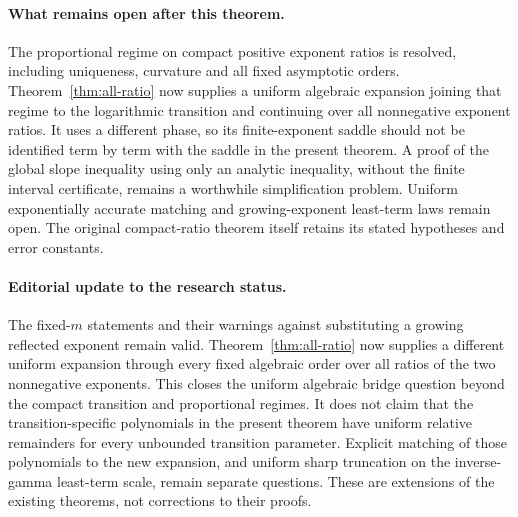 \paragraph{What remains open after this theorem.}
The proportional regime on compact positive exponent ratios is resolved,
including uniqueness, curvature and all fixed asymptotic orders.
Theorem~\ref{thm:all-ratio} now supplies a uniform algebraic expansion
joining that regime to the logarithmic transition and continuing over
all nonnegative exponent ratios. It uses a different phase, so its
finite-exponent saddle should not be identified term by term with the
saddle in the present theorem. A proof of the global slope inequality
using only an analytic inequality, without the finite interval
certificate, remains a worthwhile simplification problem. Uniform
exponentially accurate matching and growing-exponent least-term laws
remain open. The original compact-ratio theorem itself retains its
stated hypotheses and error constants.

\paragraph{Editorial update to the research status.}
The fixed-$m$ statements and their warnings against substituting a
growing reflected exponent remain valid. Theorem~\ref{thm:all-ratio}
now supplies a different uniform expansion through every fixed algebraic
order over all ratios of the two nonnegative exponents. This closes the
uniform algebraic bridge question beyond the compact transition and
proportional regimes. It does not claim that the transition-specific
polynomials in the present theorem have uniform relative remainders for
every unbounded transition parameter. Explicit matching of those
polynomials to the new expansion, and uniform sharp truncation on the
inverse-gamma least-term scale, remain separate questions. These are
extensions of the existing theorems, not corrections to their proofs.

